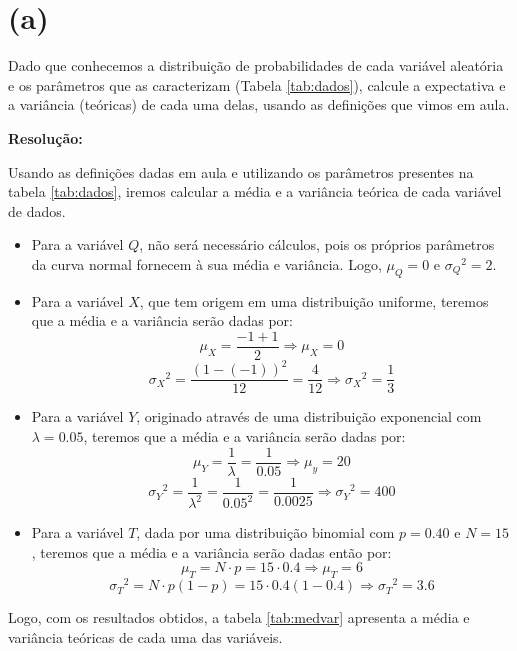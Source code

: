 \documentclass[]{abntex2}
\begin{document}
\section*{\textbf{(a)}}

\noindent Dado que conhecemos a distribuição de probabilidades de cada variável aleatória e os parâmetros que as caracterizam (Tabela \ref{tab:dados}), calcule a expectativa e a variância (teóricas) de cada uma delas, usando as definições que vimos em aula.

\textbf{Resolução:}

Usando as definições dadas em aula e utilizando os parâmetros presentes na tabela \ref{tab:dados}, iremos calcular a média e a variância teórica de cada variável de dados.

\begin{itemize}
    \item Para a variável $Q$, não será necessário cálculos, pois os próprios parâmetros da curva normal fornecem à sua média e variância. Logo, $\mu_Q = 0$ e ${{\sigma}_Q}^{2} = 2$.
    
    \item Para a variável $X$, que tem origem em uma distribuição uniforme, teremos que a média e a variância serão dadas por:
    \[
    \mu_X = \dfrac{-1+1}{2} \Rightarrow \mu_X = 0
    \]
    \[
    {{\sigma}_X}^{2} = \dfrac{{(1-(-1))}^2}{12}=\dfrac{4}{12} \Rightarrow {{\sigma}_X}^{2} = \dfrac{1}{3}
    \]

    \item Para a variável $Y$, originado através de uma distribuição exponencial com $\lambda=0.05$, teremos que a média e a variância serão dadas por:
    \[
    \mu_Y = \dfrac{1}{\lambda} = \dfrac{1}{0.05} \Rightarrow \mu_y = 20
    \]
    \[
    {{\sigma}_Y}^{2} = \dfrac{1}{\lambda^2} = \dfrac{1}{0.05^2} = \dfrac{1}{0.0025} \Rightarrow {{\sigma}_Y}^{2} = 400
    \]

    \item Para a variável $T$, dada por uma distribuição binomial com $p=0.40$ e $N=15$, teremos que a média e a variância serão dadas então por:
    \[
    \mu_T = N \cdot p = 15 \cdot 0.4 \Rightarrow \mu_T = 6
    \]
    \[
    {{\sigma}_T}^{2} = N\cdot p(1-p)=15 \cdot 0.4(1-0.4) \Rightarrow {{\sigma}_T}^{2} = 3.6
    \]
\end{itemize}

Logo, com os resultados obtidos, a tabela \ref{tab:medvar} apresenta a média e variância teóricas de cada uma das variáveis.
\end{document}
